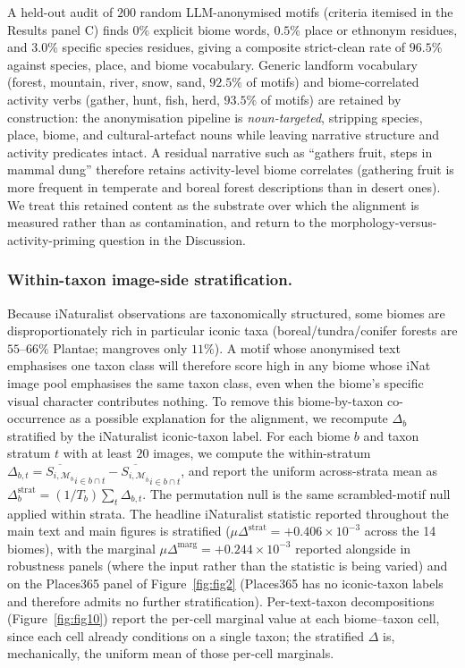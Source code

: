 \documentclass[11pt,a4paper]{article}
\begin{document}
A held-out audit of $200$ random LLM-anonymised motifs (criteria
itemised in the Results panel C) finds $0\%$ explicit biome
words, $0.5\%$ place or ethnonym residues, and $3.0\%$ specific
species residues, giving a composite strict-clean rate of
$96.5\%$ against species, place, and biome vocabulary. Generic
landform vocabulary (forest, mountain, river, snow, sand,
$92.5\%$ of motifs) and biome-correlated activity verbs (gather,
hunt, fish, herd, $93.5\%$ of motifs) are retained by
construction: the anonymisation pipeline is \emph{noun-targeted},
stripping species, place, biome, and cultural-artefact nouns
while leaving narrative structure and activity predicates intact.
A residual narrative such as ``gathers fruit, steps in mammal
dung'' therefore retains activity-level biome correlates
(gathering fruit is more frequent in temperate and boreal forest
descriptions than in desert ones). We treat this retained
content as the substrate over which the alignment is measured
rather than as contamination, and return to the
morphology-versus-activity-priming question in the Discussion.

\subsubsection*{Within-taxon image-side stratification.}
Because iNaturalist observations are taxonomically structured, some
biomes are disproportionately rich in particular iconic taxa
(boreal/tundra/conifer forests are $55$--$66\%$ Plantae; mangroves
only $11\%$). A motif whose anonymised text emphasises one taxon
class will therefore score high in any biome whose iNat image pool
emphasises the same taxon class, even when the biome's specific
visual character contributes nothing. To remove this biome-by-taxon
co-occurrence as a possible explanation for the alignment, we
recompute $\Delta_b$ stratified by the iNaturalist iconic-taxon
label. For each biome $b$ and taxon stratum $t$ with at least $20$
images, we compute the within-stratum
$\Delta_{b,t} = \overline{S_{i,\mathcal{M}_b}}_{i\in b\cap t}
              - \overline{S_{i,\mathcal{M}_{\overline{b}}}}_{i\in b\cap t}$,
and report the uniform across-strata mean as
$\Delta^{\text{strat}}_b = (1/T_b)\sum_t \Delta_{b,t}$. The
permutation null is the same scrambled-motif null applied within
strata. The headline iNaturalist statistic reported throughout the
main text and main figures is stratified
($\mu\Delta^{\text{strat}} = +0.406\times 10^{-3}$ across the 14
biomes), with the marginal $\mu\Delta^{\text{marg}} = +0.244\times
10^{-3}$ reported alongside in robustness panels (where the
input rather than the statistic is being varied) and on the
Places365 panel of Figure~\ref{fig:fig2} (Places365 has no
iconic-taxon labels and therefore admits no further
stratification). Per-text-taxon decompositions
(Figure~\ref{fig:fig10}) report the per-cell marginal value at
each biome--taxon cell, since each cell already conditions on a
single taxon; the stratified $\Delta$ is, mechanically, the
uniform mean of those per-cell marginals.
\end{document}
